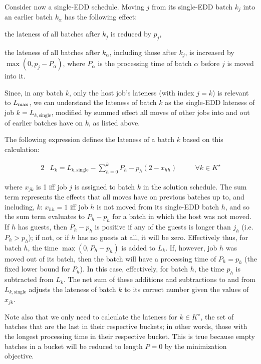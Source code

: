 \documentclass[13pt, letterpaper, oneside]{book}
\begin{document}
Consider now a single-EDD schedule. Moving $j$ from its single-EDD batch $k_j$ into an earlier
batch $k_\alpha$ has the following effect:
\begin{alist}
\item{the lateness of all batches after $k_j$ is reduced by $p_j$,}
\item{the lateness of all batches after $k_\alpha$, including those after $k_j$,
is increased by $\max(0,p_j - P_\alpha)$, where $P_\alpha$ is the processing
time of batch $\alpha$ before $j$ is moved into it.}
\end{alist}
Since, in any batch $k$, only the host job's lateness (with index $j = k$) is
relevant to $L_{\text{max}}$, we can understand the lateness of batch $k$ as the
single-EDD lateness of job $k = L_{k,\text{single}}$, modified by summed effect
all moves of other jobs into and out of earlier batches have on $k$, as listed
above.
 
The following expression defines the lateness of a batch $k$ based on this
calculation:
 
\begin{alignat}{2} & L_k = L_{k,\text{single}} - \sum_{h=0}^{k} P_h - p_h(2 -
x_{hh}) \quad && \forall k \in K^\star \end{alignat}
 
where $x_{jk}$ is 1 iff job $j$ is assigned to batch $k$ in the solution
schedule. The sum term represents the effects that all moves have on previous
batches up to, and including, $k$: $x_{hh} = 1$ iff job $h$ is not moved from
its single-EDD batch $h$, and so the sum term evaluates to $P_h - p_h$ for a
batch in which the host was not moved. If $h$ has guests, then $P_h - p_h$ is
positive if any of the guests is longer than $j_h$ (i.e. $P_h > p_h$); if not,
or if $h$ has no guests at all, it will be zero. Effectively thus, for batch
$h$, the time $\max(0, P_h-p_h)$ is added to $L_k$. If, however, job $h$ was
moved out of its batch, then the batch will have a processing time of $P_h =
p_h$ (the fixed lower bound for $P_h$). In this case, effectively, for batch
$h$, the time $p_h$ is subtracted from $L_k$. The net sum of these additions
and subtractions to and from $L_{k,\text{single}}$ adjusts the lateness of
batch $k$ to its correct number given the values of $x_{jk}$. 

Note also that we only need to calculate the lateness for $k \in K^\star$, the set
of batches that are the last in their respective buckets; in other words, those
with the longest processing time in their respective bucket. This is true
because empty batches in a bucket will be reduced to length $P = 0$ by the
minimization objective.
\end{document}
